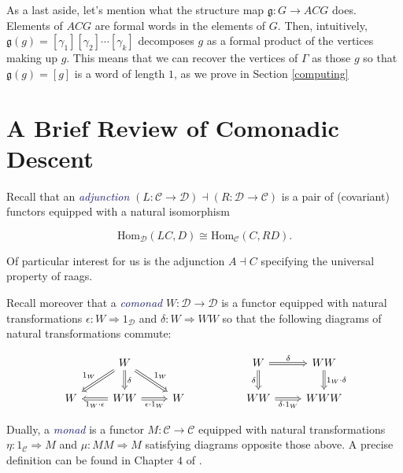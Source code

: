 \documentclass[microtype]{gtpart}
\theoremstyle{definition}
\theoremstyle{theorem}
\newcommand*{\catVarFont}[1]{\mathcal{#1}}
\newcommand{\catC}{\catVarFont{C}}
\newcommand{\catD}{\catVarFont{D}}
\newcommand*{\important}[1]{\textcolor{MidnightBlue}{\emph{#1}}}
\begin{document}
As a last aside, let's mention what the structure map 
$\mathfrak{g} : G \to ACG$ does. Elements of $ACG$ are 
formal words in the elements of $G$. Then, intuitively, 
$\mathfrak{g}(g) = [\gamma_1][\gamma_2]\cdots[\gamma_k]$ decomposes 
$g$ as a formal product of the vertices making up $g$. This means 
that we can recover the vertices of $\Gamma$ as those $g$ 
so that $\mathfrak{g}(g) = [g]$ is a word of length $1$, as we prove 
in Section \ref{computing}


\section{A Brief Review of Comonadic Descent}
\label{review}

Recall that an \important{adjunction}
$(L : \catC \to \catD) \dashv (R : \catD \to \catC)$ is a 
pair of (covariant) functors equipped with a natural isomorphism

\[ \text{Hom}_\mathcal{D}(LC,D) \cong \text{Hom}_\mathcal{C}(C,RD). \]

Of particular interest for us is the adjunction $A \dashv C$ specifying the 
universal property of raags.

Recall moreover that a \important{comonad} $W : \catD \to \catD$ is a 
functor equipped with natural transformations $\epsilon : W \Rightarrow 1_\catD$ 
and $\delta : W \Rightarrow WW$ so that the following diagrams of 
natural transformations commute:

\setlength\mathsurround{0pt}
\[
    \begin{tikzcd}
    & W &&& W & WW \\
    W & WW & W && WW & WWW
    \arrow["{1_W \cdot \epsilon}", Rightarrow, from=2-2, to=2-1]
    \arrow["{\epsilon \cdot 1_W}"', Rightarrow, from=2-2, to=2-3]
    \arrow["\delta", Rightarrow, from=1-2, to=2-2]
    \arrow["{1_W}"', Rightarrow, from=1-2, to=2-1]
    \arrow["{1_W}", Rightarrow, from=1-2, to=2-3]
    \arrow["\delta"', Rightarrow, from=1-5, to=2-5]
    \arrow["\delta", Rightarrow, from=1-5, to=1-6]
    \arrow["{\delta \cdot 1_W}"', Rightarrow, from=2-5, to=2-6]
    \arrow["{1_W \cdot \delta}", Rightarrow, from=1-6, to=2-6]
    \end{tikzcd}
\]
\setlength\mathsurround{0.8pt}

Dually, a \important{monad} is a functor $M : \catC \to \catC$ equipped with 
natural transformations $\eta : 1_\catC \Rightarrow M$ and 
$\mu : MM \Rightarrow M$ satisfying diagrams opposite those above. A precise
definition can be found in Chapter $4$ of \cite{borceuxCategoriesStructures1994}.
\end{document}
